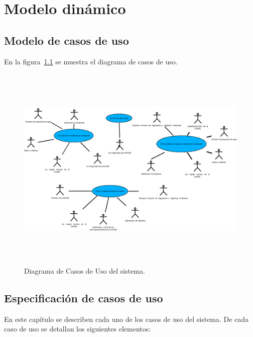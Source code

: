 \chapter{Modelo dinámico}

\section{Modelo de casos de uso}

En la figura~\ref{fig:casosdeuso} se muestra el diagrama de casos de uso.

\begin{figure}[htbp!]
	\centering
	\includegraphics[width=17cm, height=10cm]{images/1}
	\caption{Diagrama de Casos de Uso del sistema.}
	\label{fig:casosdeuso}
\end{figure}


\section{Especificación de casos de uso}

	En este capítulo se describen cada uno de los casos de uso del sistema. De cada caso de uso se detallan los siguientes elementos:\\
	

